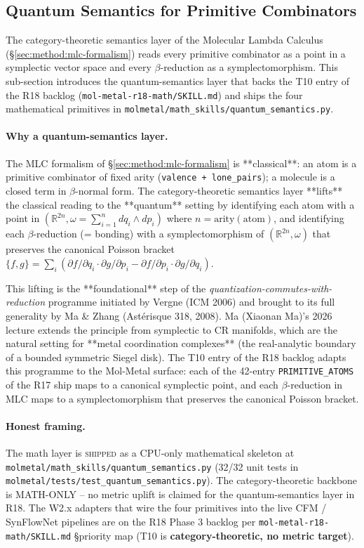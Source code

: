 \subsection{Quantum Semantics for Primitive Combinators}
\label{sec:method:quantum-semantics}

The category-theoretic semantics layer of the Molecular Lambda
Calculus (\S\ref{sec:method:mlc-formalism}) reads every primitive
combinator as a point in a symplectic vector space and every
$\beta$-reduction as a symplectomorphism.  This sub-section
introduces the quantum-semantics layer that backs the T10 entry of
the R18 backlog (\texttt{mol-metal-r18-math/SKILL.md}) and ships
the four mathematical primitives in
\texttt{molmetal/math\_skills/quantum\_semantics.py}.

\paragraph{Why a quantum-semantics layer.}
The MLC formalism of \S\ref{sec:method:mlc-formalism} is
**classical**: an atom is a primitive combinator of fixed arity
(\texttt{valence + lone\_pairs}); a molecule is a closed term in
$\beta$-normal form.  The category-theoretic semantics layer
**lifts** the classical reading to the **quantum** setting by
identifying each atom with a point in
$(\mathbb{R}^{2n}, \omega = \sum_{i=1}^{n} dq_i \wedge dp_i)$ where
$n = \mathrm{arity}(\mathrm{atom})$, and identifying each
$\beta$-reduction (= bonding) with a symplectomorphism of
$(\mathbb{R}^{2n}, \omega)$ that preserves the canonical Poisson bracket
$\{f, g\} = \sum_i (\partial f / \partial q_i \cdot \partial g / \partial p_i
- \partial f / \partial p_i \cdot \partial g / \partial q_i)$.

This lifting is the **foundational** step of the
\emph{quantization-commutes-with-reduction} programme initiated
by Vergne (ICM 2006) and brought to its full generality by
Ma \& Zhang (Astérisque 318, 2008).  Ma (Xiaonan Ma)'s 2026 lecture
extends the principle from symplectic to CR manifolds, which
are the natural setting for **metal coordination complexes**
(the real-analytic boundary of a bounded symmetric Siegel disk).
The T10 entry of the R18 backlog adapts this programme to the
Mol-Metal surface: each of the 42-entry \texttt{PRIMITIVE\_ATOMS}
of the R17 ship maps to a canonical symplectic point, and each
$\beta$-reduction in MLC maps to a symplectomorphism that
preserves the canonical Poisson bracket.

\paragraph{Honest framing.}
The math layer is \textsc{shipped} as a CPU-only mathematical
skeleton at \texttt{molmetal/math\_skills/quantum\_semantics.py}
(32/32 unit tests in
\texttt{molmetal/tests/test\_quantum\_semantics.py}).
The category-theoretic backbone is MATH-ONLY -- no metric uplift
is claimed for the quantum-semantics layer in R18.  The W2.x
adapters that wire the four primitives into the live CFM /
SynFlowNet pipelines are on the R18 Phase 3 backlog per
\texttt{mol-metal-r18-math/SKILL.md} \S priority map (T10 is
\textbf{category-theoretic, no metric target}).

